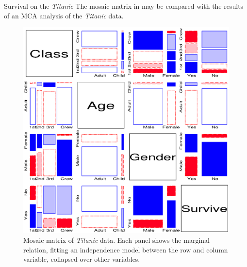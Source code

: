 \begin{Example}[titanic2]{Survival on the \emph{Titanic}}
The mosaic matrix in  may be compared with
the results of an MCA analysis of the \emph{Titanic} data.
\begin{figure}[!htb]
  \centering
  \includegraphics[scale=.7]{ch5/fig/titanmos}
  \caption[Mosaic matrix of \emph{Titanic} data]{Mosaic matrix of \emph{Titanic} data.  Each panel shows the marginal relation,
fitting an independence model between the row and column variable, collapsed over other variables.}\label{fig:titanmos}
\end{figure}
\end{Example}



